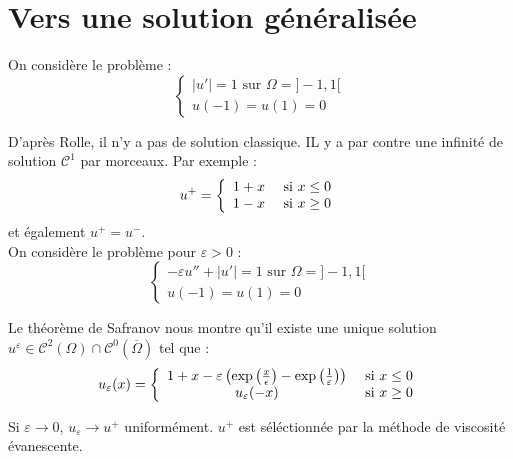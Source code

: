\section{Vers une solution généralisée}
On considère le problème :
\[\left\{ \begin{array}{c}
	|u'|=1 \text{ sur } \Omega=]-1,1[\\
	u(-1)=u(1)=0
\end{array}\right.\]

D'après Rolle, il n'y a pas de solution classique. IL y a par contre une infinité de solution $\mathscr{C}^1$ par morceaux.
Par exemple : \[u^+=\left\{ \begin{array}{c c c}
	1+x &\text{ si } x\leq 0\\
	1-x &\text{ si } x\geq 0
\end{array}\right.\]
et également $u^+=u^-$.\\
On considère le problème pour $\varepsilon>0$ :
\[\left\{ \begin{array}{c}
	-\varepsilon u''+|u'|=1 \text{ sur } \Omega=]-1,1[\\
	u(-1)=u(1)=0
\end{array}\right.\]

Le théorème de Safranov nous montre qu'il existe une unique solution $u^\varepsilon\in\mathscr{C}^2(\Omega)\cap\mathscr{C}^0(\overline{\Omega})$ tel que :
\[u_\varepsilon(x)=\left\{ \begin{array}{c c c}
	1+x-\varepsilon\left(\exp\left(\frac{x}{\epsilon}\right)-\exp\left(\frac{1}{\varepsilon}\right)\right) &\text{ si } x\leq 0\\
	u_\varepsilon(-x) &\text{ si } x\geq 0
\end{array}\right.\]

Si $\varepsilon\to 0$, $u_\varepsilon\to u^+$ uniformément. $u^+$ est séléctionnée par la méthode de viscosité évanescente.


